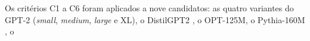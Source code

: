 Os critérios C1 a C6 foram aplicados a nove
candidatos: as quatro variantes do GPT-2 (\textit{small}, \textit{medium}, \textit{large} e
XL), o DistilGPT2 \cite{Sanh2019}, o OPT-125M, o Pythia-160M \cite{Biderman2023}, o
